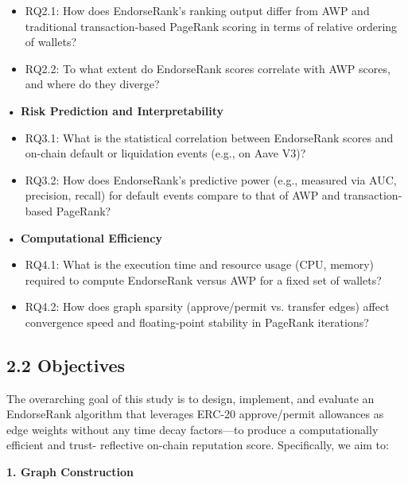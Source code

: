 \documentclass[12pt]{article}
\newcommand{\proposalSubheading}[1]{%
  \par\addvspace{0.38\baselineskip}%
  \noindent\textbf{#1}\par\nobreak\addvspace{0.08\baselineskip}%
}
\begin{document}
\begin{itemize}
\item[\textendash] RQ2.1: How does EndorseRank's ranking output differ from AWP and traditional transaction-based PageRank scoring in terms of relative ordering of wallets?
\item[\textendash] RQ2.2: To what extent do EndorseRank scores correlate with AWP scores, and where do they diverge?
\end{itemize}
\proposalSubheading{• Risk Prediction and Interpretability}

\begin{itemize}
\item[\textendash] RQ3.1: What is the statistical correlation between EndorseRank scores and on-chain default or liquidation events (e.g., on Aave V3)?
\item[\textendash] RQ3.2: How does EndorseRank's predictive power (e.g., measured via AUC, precision, recall) for default events compare to that of AWP and transaction-based PageRank?
\end{itemize}
\proposalSubheading{• Computational Efficiency}

\begin{itemize}
\item[\textendash] RQ4.1: What is the execution time and resource usage (CPU, memory) required to compute EndorseRank versus AWP for a fixed set of wallets?
\item[\textendash] RQ4.2: How does graph sparsity (approve/permit vs. transfer edges) affect convergence speed and floating-point stability in PageRank iterations?
\end{itemize}
\subsection*{2.2 Objectives}
\label{sec:objectives}

The overarching goal of this study is to design, implement, and evaluate an EndorseRank algorithm that leverages ERC-20 approve/permit allowances as edge weights without any time decay factors---to produce a computationally efficient and trust- reflective on-chain reputation score. Specifically, we aim to:


\proposalSubheading{1. Graph Construction}
\end{document}

